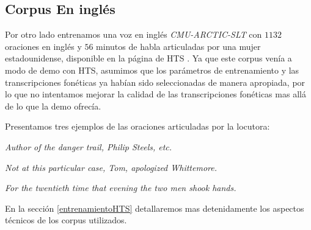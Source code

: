 
\subsection{Corpus En inglés}

Por otro lado entrenamos una voz en inglés \textit{CMU-ARCTIC-SLT}\cite{cmuArtic} con $1132$ oraciones en inglés y $56$ minutos de habla articuladas por una mujer estadounidense, disponible en la página de HTS \cite{hts}. Ya que este corpus venía a modo de demo con HTS, asumimos que los parámetros de entrenamiento y las transcripciones fonéticas ya habían sido seleccionadas de manera apropiada, por lo que no intentamos mejorar la calidad de las transcripciones fonéticas mas allá de lo que la demo ofrecía.

Presentamos tres ejemplos de las oraciones articuladas por la locutora:

\indent\indent \textit{Author of the danger trail, Philip Steels, etc.}

\indent\indent \textit{Not at this particular case, Tom, apologized Whittemore.}

\indent\indent \textit{For the twentieth time that evening the two men shook hands.}

En la sección \ref{entrenamientoHTS} detallaremos mas detenidamente los aspectos técnicos de los corpus utilizados.

